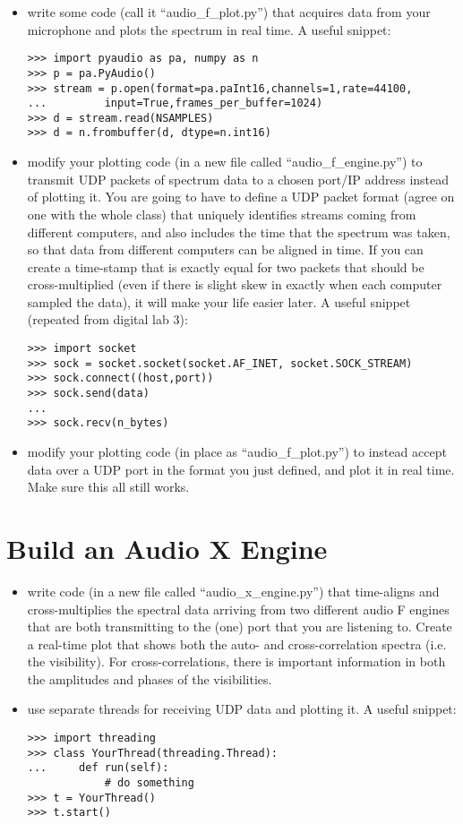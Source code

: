 \documentclass[11pt]{article}
\begin{document}
\begin{itemize}
\item write some code (call it ``audio\_f\_plot.py'') that acquires data from your microphone and plots the
spectrum in real time.  A useful snippet:
\begin{verbatim}
>>> import pyaudio as pa, numpy as n
>>> p = pa.PyAudio()
>>> stream = p.open(format=pa.paInt16,channels=1,rate=44100,
...         input=True,frames_per_buffer=1024)
>>> d = stream.read(NSAMPLES)
>>> d = n.frombuffer(d, dtype=n.int16)
\end{verbatim}
\item modify your plotting code (in a new file called ``audio\_f\_engine.py'') to transmit UDP packets
of spectrum data to a chosen port/IP address instead of plotting it.  You are going to have to define a 
UDP packet format
(agree on one with the whole class) that uniquely identifies streams coming from different computers, and
also includes the time that the spectrum was taken, so that data from different computers can be aligned in
time.  If you can create a time-stamp that is exactly equal for two packets that should be cross-multiplied
(even if there is slight skew in exactly when each computer sampled the data), it will make your life easier
later.  A useful snippet (repeated from digital lab 3):
\begin{verbatim}
>>> import socket
>>> sock = socket.socket(socket.AF_INET, socket.SOCK_STREAM)
>>> sock.connect((host,port))
>>> sock.send(data)
...
>>> sock.recv(n_bytes)
\end{verbatim}
\item modify your plotting code (in place as ``audio\_f\_plot.py'') to instead accept data over a UDP port
in the format you just defined, and plot it in real time.  Make sure this all still works.
\end{itemize}

\section{Build an Audio X Engine}

\begin{itemize}
\item write code (in a new file called ``audio\_x\_engine.py'') that time-aligns and cross-multiplies 
the spectral data arriving from two different audio F engines that are both transmitting to the (one) port that
you are listening to.  Create a real-time plot that shows both the auto- and cross-correlation spectra 
(i.e. the visibility).  For cross-correlations, there is important information in both the amplitudes and
phases of the visibilities.
\item use separate threads for receiving UDP data and plotting it.  A useful snippet:
\begin{verbatim}
>>> import threading
>>> class YourThread(threading.Thread):
...     def run(self):
            # do something
>>> t = YourThread()
>>> t.start()
\end{verbatim}
\end{itemize}
\end{document}
